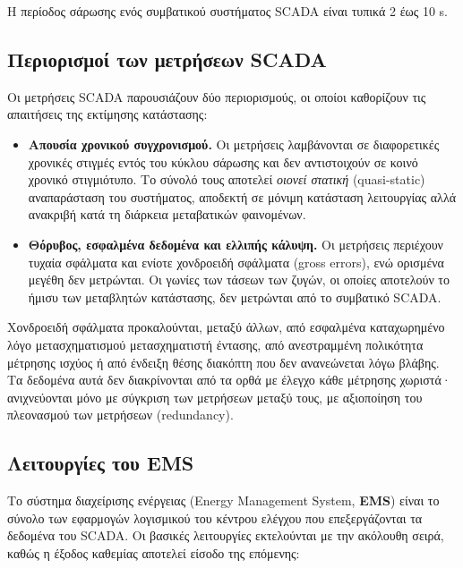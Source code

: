 Η περίοδος σάρωσης ενός συμβατικού συστήματος SCADA είναι τυπικά 2 έως 10 s.

\subsection{Περιορισμοί των μετρήσεων SCADA}

Οι μετρήσεις SCADA παρουσιάζουν δύο περιορισμούς, οι οποίοι καθορίζουν τις απαιτήσεις της
εκτίμησης κατάστασης:

\begin{itemize}
\item \textbf{Απουσία χρονικού συγχρονισμού.} Οι μετρήσεις λαμβάνονται σε διαφορετικές
      χρονικές στιγμές εντός του κύκλου σάρωσης και δεν αντιστοιχούν σε κοινό χρονικό
      στιγμιότυπο. Το σύνολό τους αποτελεί \emph{οιονεί στατική} (quasi-static)
      αναπαράσταση του συστήματος, αποδεκτή σε μόνιμη κατάσταση λειτουργίας αλλά
      ανακριβή κατά τη διάρκεια μεταβατικών φαινομένων.
\item \textbf{Θόρυβος, εσφαλμένα δεδομένα και ελλιπής κάλυψη.} Οι μετρήσεις περιέχουν
      τυχαία σφάλματα και ενίοτε χονδροειδή σφάλματα (gross errors), ενώ ορισμένα μεγέθη
      δεν μετρώνται. Οι γωνίες των τάσεων των ζυγών, οι οποίες αποτελούν το ήμισυ των
      μεταβλητών κατάστασης, δεν μετρώνται από το συμβατικό SCADA.
\end{itemize}

Χονδροειδή σφάλματα προκαλούνται, μεταξύ άλλων, από εσφαλμένα καταχωρημένο λόγο
μετασχηματισμού μετασχηματιστή έντασης, από ανεστραμμένη πολικότητα μέτρησης ισχύος ή από
ένδειξη θέσης διακόπτη που δεν ανανεώνεται λόγω βλάβης. Τα δεδομένα αυτά δεν διακρίνονται
από τα ορθά με έλεγχο κάθε μέτρησης χωριστά· ανιχνεύονται μόνο με σύγκριση των μετρήσεων
μεταξύ τους, με αξιοποίηση του πλεονασμού των μετρήσεων (redundancy).

\subsection{Λειτουργίες του EMS}

Το σύστημα διαχείρισης ενέργειας (Energy Management System, \textbf{EMS}) είναι το σύνολο των
εφαρμογών λογισμικού του κέντρου ελέγχου που επεξεργάζονται τα δεδομένα του SCADA. Οι
βασικές λειτουργίες εκτελούνται με την ακόλουθη σειρά, καθώς η έξοδος καθεμίας αποτελεί
είσοδο της επόμενης:

